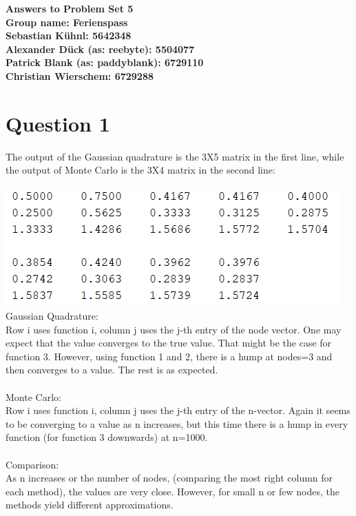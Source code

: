\documentclass{article}
\begin{document}
	\begin{center}
		\LARGE \bfseries{Answers to Problem Set 5}\\
		Group name: Ferienspass\vspace{.5cm}\\
		\normalsize \normalfont
		Sebastian K\"uhnl: 5642348\\
		Alexander D\"uck (as: reebyte): 5504077\\
		Patrick Blank (as: paddyblank): 6729110\\
		Christian Wierschem: 6729288
	\end{center}
	\normalsize	
	\section{Question 1}
The output of the Gaussian quadrature is the 3X5 matrix in the first line, while the output of Monte Carlo is the 3X4 matrix in the second line:\\\\
	\includegraphics[width = \textwidth, keepaspectratio]{output.png}
	Gaussian Quadrature:\\
	Row i uses function i, column j uses the j-th entry of the node vector. One may expect that the value converges to the true value. That might be the case for function 3. However, using function 1 and 2, there is a hump at nodes=3 and then converges to a value. The rest is as expected.\\\\
	Monte Carlo:\\
	Row i uses function i, column j uses the j-th entry of the n-vector. Again it seems to be converging to a value as n increases, but this time there is a hump in every function (for function 3 downwards) at n=1000.\\\\
	Comparison:\\
	As n increases or the number of nodes, (comparing the most right column for each method), the values are very close. However, for small n or few nodes, the methods yield different approximations.
	\newpage
\end{document}
